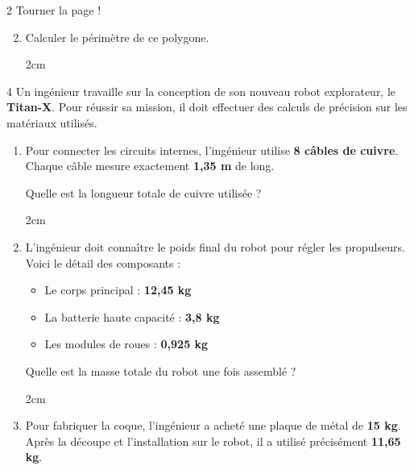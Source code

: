 \documentclass[a4paper]{book}
\begin{document}
{\begin{exerciceNote}{2}
\vfill
\hfill Tourner la page !

\newpage

        \begin{enumerate}
            \setcounter{enumi}{1}
            \item Calculer le périmètre de ce polygone.

            \begin{ZoneReponse}{2cm}               
            \end{ZoneReponse}
        \end{enumerate}
    \end{exerciceNote}


    \begin{exerciceNote}{4}
        Un ingénieur travaille sur la conception de son nouveau robot explorateur, le \textbf{Titan-X}. Pour réussir sa mission, il doit effectuer des calculs de précision sur les matériaux utilisés.

        \begin{enumerate}[leftmargin=*]
            \item Pour connecter les circuits internes, l'ingénieur utilise \textbf{8 câbles de cuivre}. Chaque câble mesure exactement \textbf{1,35 m} de long.

            Quelle est la longueur totale de cuivre utilisée ?

            \begin{ZoneReponse}{2cm}
            \end{ZoneReponse}

            \item L'ingénieur doit connaître le poids final du robot pour régler les propulseurs. Voici le détail des composants :
            \begin{itemize}
                \item Le corps principal : \textbf{12,45 kg}
                \item La batterie haute capacité : \textbf{3,8 kg}
                \item Les modules de roues : \textbf{0,925 kg}
            \end{itemize}

            Quelle est la masse totale du robot une fois assemblé ?

            \begin{ZoneReponse}{2cm}
            \end{ZoneReponse}

            \item Pour fabriquer la coque, l'ingénieur a acheté une plaque de métal de \textbf{15 kg}. Après la découpe et l'installation sur le robot, il a utilisé précisément \textbf{11,65 kg}.
            

\end{enumerate}
\end{exerciceNote}}
\end{document}
